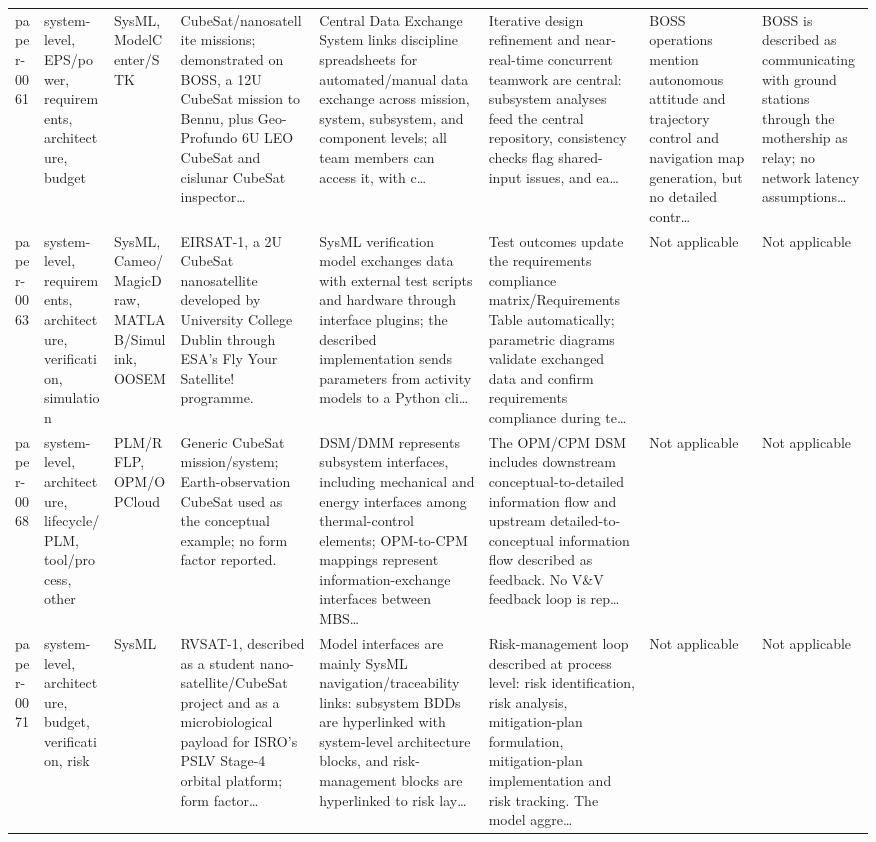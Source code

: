 \documentclass[10pt]{article}
\begin{document}
\begin{landscape}
\begin{longtable}{p{1.1cm}p{3.1cm}p{2.5cm}p{3.3cm}p{4.0cm}p{3.5cm}p{2.8cm}p{2.8cm}}
paper-0061 & system-level, EPS/power, requirements, architecture, budget & SysML, ModelCenter/STK & CubeSat/nanosatellite missions; demonstrated on BOSS, a 12U CubeSat mission to Bennu, plus Geo-Profundo 6U LEO CubeSat and cislunar CubeSat inspector… & Central Data Exchange System links discipline spreadsheets for automated/manual data exchange across mission, system, subsystem, and component levels; all team members can access it, with c… & Iterative design refinement and near-real-time concurrent teamwork are central: subsystem analyses feed the central repository, consistency checks flag shared-input issues, and ea… & BOSS operations mention autonomous attitude and trajectory control and navigation map generation, but no detailed contr… & BOSS is described as communicating with ground stations through the mothership as relay; no network latency assumptions… \\
paper-0063 & system-level, requirements, architecture, verification, simulation & SysML, Cameo/MagicDraw, MATLAB/Simulink, OOSEM & EIRSAT-1, a 2U CubeSat nanosatellite developed by University College Dublin through ESA's Fly Your Satellite! programme. & SysML verification model exchanges data with external test scripts and hardware through interface plugins; the described implementation sends parameters from activity models to a Python cli… & Test outcomes update the requirements compliance matrix/Requirements Table automatically; parametric diagrams validate exchanged data and confirm requirements compliance during te… & Not applicable & Not applicable \\
paper-0068 & system-level, architecture, lifecycle/PLM, tool/process, other & PLM/RFLP, OPM/OPCloud & Generic CubeSat mission/system; Earth-observation CubeSat used as the conceptual example; no form factor reported. & DSM/DMM represents subsystem interfaces, including mechanical and energy interfaces among thermal-control elements; OPM-to-CPM mappings represent information-exchange interfaces between MBS… & The OPM/CPM DSM includes downstream conceptual-to-detailed information flow and upstream detailed-to-conceptual information flow described as feedback. No V\&V feedback loop is rep… & Not applicable & Not applicable \\
paper-0071 & system-level, architecture, budget, verification, risk & SysML & RVSAT-1, described as a student nano-satellite/CubeSat project and as a microbiological payload for ISRO's PSLV Stage-4 orbital platform; form factor… & Model interfaces are mainly SysML navigation/traceability links: subsystem BDDs are hyperlinked with system-level architecture blocks, and risk-management blocks are hyperlinked to risk lay… & Risk-management loop described at process level: risk identification, risk analysis, mitigation-plan formulation, mitigation-plan implementation and risk tracking. The model aggre… & Not applicable & Not applicable \\

\end{longtable}
\end{landscape}
\end{document}
